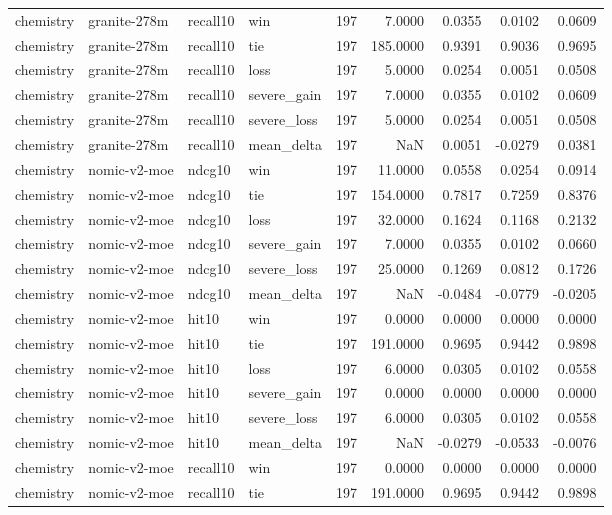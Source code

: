 \begin{tabular}{llllrrrrr}
chemistry & granite-278m & recall10 & win & 197 & 7.0000 & 0.0355 & 0.0102 & 0.0609 \\
chemistry & granite-278m & recall10 & tie & 197 & 185.0000 & 0.9391 & 0.9036 & 0.9695 \\
chemistry & granite-278m & recall10 & loss & 197 & 5.0000 & 0.0254 & 0.0051 & 0.0508 \\
chemistry & granite-278m & recall10 & severe\_gain & 197 & 7.0000 & 0.0355 & 0.0102 & 0.0609 \\
chemistry & granite-278m & recall10 & severe\_loss & 197 & 5.0000 & 0.0254 & 0.0051 & 0.0508 \\
chemistry & granite-278m & recall10 & mean\_delta & 197 & NaN & 0.0051 & -0.0279 & 0.0381 \\
chemistry & nomic-v2-moe & ndcg10 & win & 197 & 11.0000 & 0.0558 & 0.0254 & 0.0914 \\
chemistry & nomic-v2-moe & ndcg10 & tie & 197 & 154.0000 & 0.7817 & 0.7259 & 0.8376 \\
chemistry & nomic-v2-moe & ndcg10 & loss & 197 & 32.0000 & 0.1624 & 0.1168 & 0.2132 \\
chemistry & nomic-v2-moe & ndcg10 & severe\_gain & 197 & 7.0000 & 0.0355 & 0.0102 & 0.0660 \\
chemistry & nomic-v2-moe & ndcg10 & severe\_loss & 197 & 25.0000 & 0.1269 & 0.0812 & 0.1726 \\
chemistry & nomic-v2-moe & ndcg10 & mean\_delta & 197 & NaN & -0.0484 & -0.0779 & -0.0205 \\
chemistry & nomic-v2-moe & hit10 & win & 197 & 0.0000 & 0.0000 & 0.0000 & 0.0000 \\
chemistry & nomic-v2-moe & hit10 & tie & 197 & 191.0000 & 0.9695 & 0.9442 & 0.9898 \\
chemistry & nomic-v2-moe & hit10 & loss & 197 & 6.0000 & 0.0305 & 0.0102 & 0.0558 \\
chemistry & nomic-v2-moe & hit10 & severe\_gain & 197 & 0.0000 & 0.0000 & 0.0000 & 0.0000 \\
chemistry & nomic-v2-moe & hit10 & severe\_loss & 197 & 6.0000 & 0.0305 & 0.0102 & 0.0558 \\
chemistry & nomic-v2-moe & hit10 & mean\_delta & 197 & NaN & -0.0279 & -0.0533 & -0.0076 \\
chemistry & nomic-v2-moe & recall10 & win & 197 & 0.0000 & 0.0000 & 0.0000 & 0.0000 \\
chemistry & nomic-v2-moe & recall10 & tie & 197 & 191.0000 & 0.9695 & 0.9442 & 0.9898 \\

\end{tabular}
